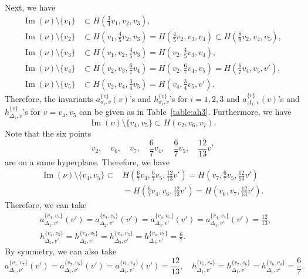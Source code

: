 \documentclass[11pt]{article}
\theoremstyle{definition}
\numberwithin{equation}{section}
\begin{document}
Next, we have 
\begin{align*}
\operatorname{Im}(\nu) \setminus \{ v_1 \} &\subset H \left( \frac{3}{4} v_1, v_2, v_3 \right), \\
\operatorname{Im}(\nu) \setminus \{ v_2 \} &\subset H \left( v_1, \frac{4}{5} v_2, v_3 \right) = H \left( \frac{4}{5} v_2, v_3, v_4 \right) \subset H \left( \frac{8}{9} v_2, v_4, v_5 \right), \\
\operatorname{Im}(\nu) \setminus \{ v_3 \} &\subset H \left( v_1, v_2, \frac{4}{5} v_3 \right) = H \left( v_2, \frac{4}{5} v_3, v_4 \right), \\
\operatorname{Im}(\nu) \setminus \{ v_4 \} &\subset H \left( v_2, v_3, \frac{6}{7}v_4 \right) = H \left( v_2, \frac{6}{7}v_4, v_5 \right) = H \left(\frac{6}{7}v_4, v_5 ,v' \right), \\
\operatorname{Im}(\nu) \setminus \{ v_5 \} &\subset H \left( v_2, v_4, \frac{3}{4} v_5 \right) = H \left(v_4, \frac{3}{4} v_5, v' \right).
\end{align*}
Therefore, 
the invariants $a^{\{ v \}}_{\sigma _i, v}(v)$'s and $h^{\{ v \}}_{\sigma _i, v}$'s for $i=1,2,3$ 
and $a^{\{ v \}}_{\Delta _1, v}(v)$'s and $h^{\{ v \}}_{\Delta _1, v}$'s for $v = v_4, v_5$ can be given as in Table~\ref{table:ah3}. 
Furthermore, we have
\[
\operatorname{Im}(\nu) \setminus \{ v_4, v_5 \} \subset H(v_2, v_6, v_7). 
\]
Note that the six points
\[
v_2, \quad v_6, \quad v_7, \quad \frac{6}{7}v_4, \quad \frac{6}{7}v_5, \quad \frac{12}{13}v'
\]
are on a same hyperplane. 
Therefore, we have 
\begin{align*}
\operatorname{Im}(\nu) \setminus \{ v_4, v_5 \} 
\subset & H \left( \frac{6}{7}v_4, \frac{6}{7}v_5, \frac{12}{13}v' \right)
= H \left( v_7, \frac{6}{7}v_5, \frac{12}{13}v' \right) \\
&= H \left( \frac{6}{7}v_4, v_6, \frac{12}{13}v' \right)
= H \left( v_6, v_7, \frac{12}{13}v' \right). 
\end{align*}
Therefore, we can take 
\begin{align*}
&a^{\{ v_4, v_5 \}}_{\Delta _1, v'}(v') = a^{\{ v_4, v_5 \}}_{\Delta _2, v'}(v') = a^{\{ v_4, v_5 \}}_{\Delta _3, v'}(v') = a^{\{ v_4, v_5 \}}_{\Delta _4, v'}(v') = \frac{12}{13}, \\
&h^{\{ v_4, v_5 \}}_{\Delta _1, v'} = h^{\{ v_4, v_5 \}}_{\Delta _2, v'} = h^{\{ v_4, v_5 \}}_{\Delta _3, v'} = h^{\{ v_4, v_5 \}}_{\Delta _4, v'} = \frac{6}{7}. 
\end{align*}
By symmetry, we can also take
\[
a^{\{ v_5, v_7 \}}_{\Delta _1, v'}(v')
=a^{\{ v_7, v_6 \}}_{\Delta _1, v'}(v')
=a^{\{ v_6, v_4 \}}_{\Delta _1, v'}(v') = \frac{12}{13}, \quad
h^{\{ v_5, v_7 \}}_{\Delta _1, v'}
=h^{\{ v_7, v_6 \}}_{\Delta _1, v'}
=h^{\{ v_6, v_4 \}}_{\Delta _1, v'} = \frac{6}{7}.
\]
\end{document}
